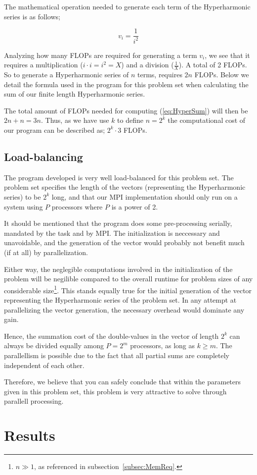 \documentclass[fontsize=11pt,paper=a4,titlepage]{report}
\begin{document}
The mathematical operation needed to generate each term of the Hyperharmonic
series is as follows;

\begin{equation}
	v_i = \frac{1}{i^2}
\end{equation}

Analyzing how many FLOPs are required for generating a term $v_i$, we see that
it requires a multiplication ($i\cdot i = i^2 = X$) and a division
($\frac{1}{X}$). A total of 2 FLOPs. So to generate a Hyperharmonic series of
$n$ terms, requires $2n$ FLOPs. Below we detail the formula used in the program
for this problem set when calculating the sum of our finite length Hyperharmonic
series.

The total amount of FLOPs needed for computing (\ref{eq:HyperSum}) will then be
$2n + n = 3n$. Thus, as we have use $k$ to define $n=2^k$ the computational cost
of our program can be described as; $2^k\cdot 3$ FLOPs.

\subsection{Load-balancing}

The program developed is very well load-balanced for this problem set. The
problem set specifies the length of the vectors (representing the Hyperharmonic
series) to be $2^k$ long, and that our MPI implementation should only run on a
system using $P$ processors where $P$ is a power of 2.

It should be mentioned that the program does some pre-processing serially,
mandated by the task and by MPI. The initialization is neccessary and
unavoidable, and the generation of the vector would probably not benefit much
(if at all) by parallelization.

Either way, the neglegible computations involved in the initialization of the
problem will be negilible compared to the overall  runtime for problem sizes of
any considerable size\footnote{$n \gg 1$, as  referenced in
subsection~\ref{subsec:MemReq}.}. This stands equally true for the  initial
generation of the vector representing the Hyperharmonic series of the problem
set. In any attempt at parallelizing the vector generation, the  necessary
overhead would dominate any gain.

Hence, the summation cost of the double-values in the vector of length $2^k$ can
always be divided equally among $P = 2^m$ processors, as long as $k\geq m$. The
parallellism is possible due to the fact that all partial sums are completely
independent of each other. \newline

Therefore, we believe that you can safely conclude that within the parameters
given in this problem set, this problem is very attractive to solve through
parallell processing.

\section{Results}

\end{document}
